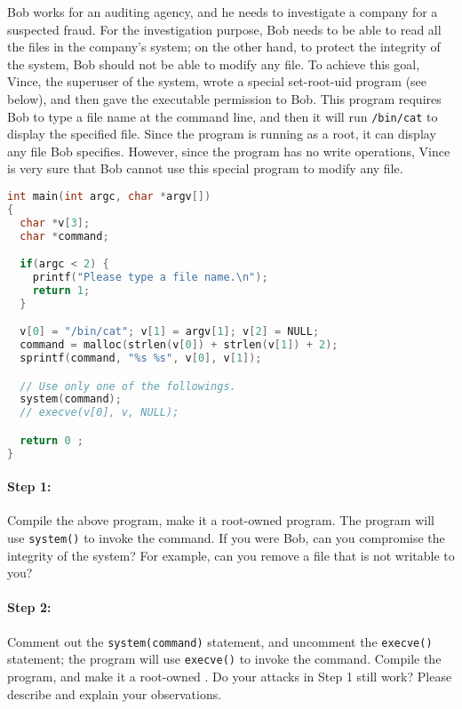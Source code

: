 Bob works for an auditing agency, and he needs to investigate a company for a suspected
fraud. For the investigation purpose, Bob needs to be able to read
all the files in the
company's \unix system; on the other hand, to protect the integrity of the system,
Bob should not be able to modify any file.
To achieve this goal, Vince, the superuser of the system,
wrote a special set-root-uid program (see
below), and then gave the executable permission to Bob. This program requires
Bob to type a file name at the command line, and then it will
run {\tt /bin/cat} to display the specified file. Since the program is running
as a root, it can display any file Bob specifies. However, since the program
has no write operations, Vince is very sure that Bob cannot use this special program
to modify any file.

\begin{lstlisting}[language=C, caption=\texttt{catall.c}]
int main(int argc, char *argv[])
{
  char *v[3];
  char *command;

  if(argc < 2) {
    printf("Please type a file name.\n");
    return 1;
  }

  v[0] = "/bin/cat"; v[1] = argv[1]; v[2] = NULL;
  command = malloc(strlen(v[0]) + strlen(v[1]) + 2);
  sprintf(command, "%s %s", v[0], v[1]);

  // Use only one of the followings.
  system(command);
  // execve(v[0], v, NULL);

  return 0 ;
}
\end{lstlisting}


\paragraph{Step 1:} Compile the above program, make it a root-owned
\setuid program. The program will use
{\tt system()} to invoke the command.
If you were Bob, can you compromise the integrity of the system? For example,
can you remove a file that is not writable to you?


\paragraph{Step 2:} Comment out the {\tt system(command)} statement, and
uncomment the {\tt execve()} statement; the program
will use {\tt execve()} to invoke the command. Compile the program, and
make it a root-owned \setuid.
Do your attacks in Step 1 still work? Please describe and explain your observations.



